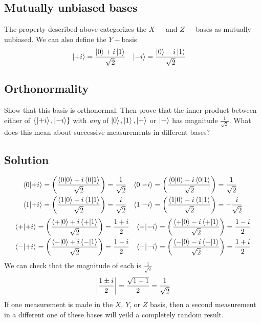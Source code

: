 \documentclass{article}
\begin{document}
\subsection*{Mutually unbiased bases}
The property described above categorizes the $X-$ and $Z-$ bases as mutually unbiased. We can also define the $Y-$basis
\begin{align}
\ket{+i} &= \frac{\ket{0}+i\ket{1}}{\sqrt{2}} & \ket{-i} &= \frac{\ket{0}-i\ket{1}}{\sqrt{2}}
\end{align}

\subsection*{Orthonormality}
Show that this basis is orthonormal. Then prove that the inner product between either of $\{\ket{+i}, \ket{-i}\}$ with \textit{any} of $\ket{0}, \ket{1}, \ket{+}$ or $\ket{-}$ has magnitude $\frac{1}{\sqrt{2}}$. What does this mean about successive measurements in different bases?
\subsection*{Solution}
\begin{align*}
\braket{0}{+i} &= \qty(\frac{\braket{0}{0} + i\bra{0}\ket{1}}{\sqrt{2}}) = \frac{1}{\sqrt{2}} & \braket{0}{-i} &= \qty(\frac{\braket{0}{0} - i\bra{0}\ket{1}}{\sqrt{2}}) = \frac{1}{\sqrt{2}} \\
\braket{1}{+i} &= \qty(\frac{\braket{1}{0} + i\bra{1}\ket{1}}{\sqrt{2}}) = \frac{i}{\sqrt{2}} & \braket{1}{-i} &= \qty(\frac{\braket{1}{0} - i\bra{1}\ket{1}}{\sqrt{2}}) = -\frac{i}{\sqrt{2}} \\
\end{align*}
\begin{align*}
\braket{+}{+i} &= \qty(\frac{\braket{+}{0} + i\bra{+}\ket{1}}{\sqrt{2}}) = \frac{1+i}{2} & \braket{+}{-i} &= \qty(\frac{\braket{+}{0} - i\bra{+}\ket{1}}{\sqrt{2}}) = \frac{1-i}{2} \\
\braket{-}{+i} &= \qty(\frac{\braket{-}{0} + i\bra{-}\ket{1}}{\sqrt{2}}) = \frac{1-i}{2} & \braket{-}{-i} &= \qty(\frac{\braket{-}{0} - i\bra{-}\ket{1}}{\sqrt{2}}) = \frac{1+i}{2} \\
\end{align*}
We can check that the magnitude of each is $\frac{1}{\sqrt{2}}$
$$
\qty|\frac{1\pm i}{2}| = \frac{\sqrt{1+1}}{2} = \frac{1}{\sqrt{2}}
$$
If one measurement is made in the $X$, $Y$, or $Z$ basis, then a second measurement in a different one of these bases will yeild a completely random result.
\end{document}
